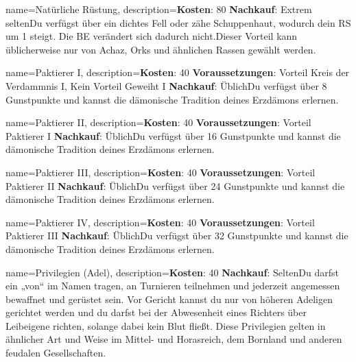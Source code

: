 {
    name={Natürliche Rüstung},
    description={\textbf{Kosten}: 80 \textbf{Nachkauf}: Extrem selten\newline Du verfügst über ein dichtes Fell oder zähe Schuppenhaut, wodurch dein RS um 1 steigt. Die BE verändert sich dadurch nicht.\newline Dieser Vorteil kann üblicherweise nur von Achaz, Orks und ähnlichen Rassen gewählt werden.}
}


{
    name={Paktierer I},
    description={\textbf{Kosten}: 40 \textbf{Voraussetzungen}: Vorteil Kreis der Verdammnis I, Kein Vorteil Geweiht I \textbf{Nachkauf}: Üblich\newline Du verfügst über 8 Gunstpunkte und kannst die dämonische Tradition deines Erzdämons erlernen.}
}


{
    name={Paktierer II},
    description={\textbf{Kosten}: 40 \textbf{Voraussetzungen}: Vorteil Paktierer I \textbf{Nachkauf}: Üblich\newline Du verfügst über 16 Gunstpunkte und kannst die dämonische Tradition deines Erzdämons erlernen.}
}


{
    name={Paktierer III},
    description={\textbf{Kosten}: 40 \textbf{Voraussetzungen}: Vorteil Paktierer II \textbf{Nachkauf}: Üblich\newline Du verfügst über 24 Gunstpunkte und kannst die dämonische Tradition deines Erzdämons erlernen.}
}


{
    name={Paktierer IV},
    description={\textbf{Kosten}: 40 \textbf{Voraussetzungen}: Vorteil Paktierer III \textbf{Nachkauf}: Üblich\newline Du verfügst über 32 Gunstpunkte und kannst die dämonische Tradition deines Erzdämons erlernen.}
}


{
    name={Privilegien (Adel)},
    description={\textbf{Kosten}: 40 \textbf{Nachkauf}: Selten\newline Du darfst ein „von“ im Namen tragen, an Turnieren teilnehmen und jederzeit angemessen bewaffnet und gerüstet sein. Vor Gericht kannst du nur von höheren Adeligen gerichtet werden und du darfst bei der Abwesenheit eines Richters über Leibeigene richten, solange dabei kein Blut fließt. Diese Privilegien gelten in ähnlicher Art und Weise im Mittel- und Horasreich, dem Bornland und anderen feudalen Gesellschaften.}
}


